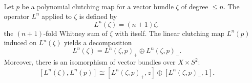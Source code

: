 Let $p$ be a polynomial clutching map for a vector bundle $\zeta$ of degree $\leq n$. The operator $L^n$ applied to $\zeta$ is defined by
$$
L^n(\zeta) = (n+1)\zeta,
$$
the $(n+1)$-fold Whitney sum of $\zeta$ with itself. The linear clutching map $L^n(p)$ induced on $L^n(\zeta)$ yields a decomposition
$$
L^n(\zeta) = L^n(\zeta, p)_+ \oplus L^n(\zeta, p)_-.
$$
Moreover, there is an isomorphism of vector bundles over $X \times S^2$:
$$
[L^n(\zeta), L^n(p)] \cong [L^n(\zeta, p)_+, z] \oplus [L^n(\zeta, p)_-, 1].
$$
